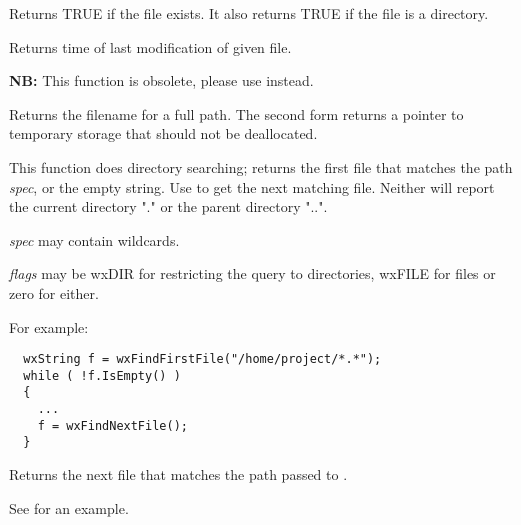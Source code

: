 
Returns TRUE if the file exists. It also returns TRUE if the file is
a directory.

\label{wxfilemodificationtime}


Returns time of last modification of given file.

\label{wxfilenamefrompath}



{\bf NB:} This function is obsolete, please use 
 instead.

Returns the filename for a full path. The second form returns a pointer to
temporary storage that should not be deallocated.

\label{wxfindfirstfile}


This function does directory searching; returns the first file
that matches the path {\it spec}, or the empty string. Use  to
get the next matching file. Neither will report the current directory "." or the
parent directory "..".

{\it spec} may contain wildcards.

{\it flags} may be wxDIR for restricting the query to directories, wxFILE for files or zero for either.

For example:

\begin{verbatim}
  wxString f = wxFindFirstFile("/home/project/*.*");
  while ( !f.IsEmpty() )
  {
    ...
    f = wxFindNextFile();
  }
\end{verbatim}

\label{wxfindnextfile}


Returns the next file that matches the path passed to .

See  for an example.

